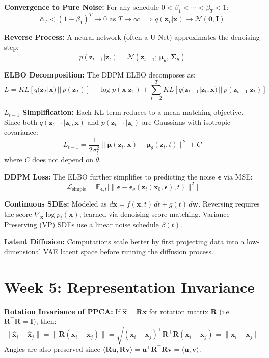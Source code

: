\documentclass[12pt]{article}
\begin{document}
\textbf{Convergence to Pure Noise:} For any schedule $0 < \beta_1 < \cdots < \beta_T < 1$:
\[
\bar{\alpha}_T < (1-\beta_1)^T \to 0 \text{ as } T\to\infty \implies q(\bm{z}_T|\bm{x}) \to \mathcal{N}(\bm{0}, \bm{I})
\]

\textbf{Reverse Process:} A neural network (often a U-Net) approximates the denoising step:
\[
p(\bm{z}_{t-1}|\bm{z}_t) = \mathcal{N}(\bm{z}_{t-1};\, \bm{\mu}_\theta,\, \bm{\Sigma}_\theta)
\]

\textbf{ELBO Decomposition:} The DDPM ELBO decomposes as:
\[
L = KL[q(\bm{z}_T|\bm{x}) \,||\, p(\bm{z}_T)] - \log p(\bm{x}|\bm{z}_1) + \sum_{t=2}^T KL[q(\bm{z}_{t-1}|\bm{z}_t,\bm{x}) \,||\, p(\bm{z}_{t-1}|\bm{z}_t)]
\]

\textbf{$L_{t-1}$ Simplification:} Each KL term reduces to a mean-matching objective. Since both $q(\bm{z}_{t-1}|\bm{z}_t,\bm{x})$ and $p(\bm{z}_{t-1}|\bm{z}_t)$ are Gaussians with isotropic covariance:
\[
L_{t-1} = \frac{1}{2\sigma_t^2}\bigl\|\tilde{\bm{\mu}}(\bm{z}_t, \bm{x}) - \bm{\mu}_\theta(\bm{z}_t, t)\bigr\|^2 + C
\]
where $C$ does not depend on $\theta$.

\textbf{DDPM Loss:} The ELBO further simplifies to predicting the noise $\bm{\epsilon}$ via MSE:
\[
\mathcal{L}_{\text{simple}} = \mathbb{E}_{\bm{\epsilon}, t}\bigl[\|\bm{\epsilon} - \bm{\epsilon}_\theta(\bm{z}_t(\bm{x}_0, \bm{\epsilon}), t)\|^2\bigr]
\]

\textbf{Continuous SDEs:} Modeled as $d\bm{x} = f(\bm{x},t)\,dt + g(t)\,d\bm{w}$. Reversing requires the score $\nabla_{\bm{x}} \log p_t(\bm{x})$, learned via denoising score matching. Variance Preserving (VP) SDEs use a linear noise schedule $\beta(t)$.

\textbf{Latent Diffusion:} Computations scale better by first projecting data into a low-dimensional VAE latent space before running the diffusion process.

\section*{Week 5: Representation Invariance}

\textbf{Rotation Invariance of PPCA:} If $\hat{\bm{x}} = \bm{R}\bm{x}$ for rotation matrix $\bm{R}$ (i.e.\ $\bm{R}^\top\bm{R} = \bm{I}$), then:
\[
\|\hat{\bm{x}}_i - \hat{\bm{x}}_j\| = \|\bm{R}(\bm{x}_i - \bm{x}_j)\| = \sqrt{(\bm{x}_i-\bm{x}_j)^\top \bm{R}^\top\bm{R}(\bm{x}_i-\bm{x}_j)} = \|\bm{x}_i - \bm{x}_j\|
\]
Angles are also preserved since $\langle \bm{R}\bm{u}, \bm{R}\bm{v}\rangle = \bm{u}^\top\bm{R}^\top\bm{R}\bm{v} = \langle\bm{u},\bm{v}\rangle$.
\end{document}
